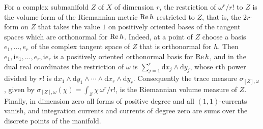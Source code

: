 For a complex submanifold $Z$ of $X$ of dimension $r$, the restriction of $\omega^r/r!$ to $Z$ is the volume form of the Riemannian metric $\operatorname{Re} h$ restricted to $Z$, that is, the $2r$-form on $Z$ that takes the value $1$ on positively oriented bases of the tangent spaces which are orthonormal for $\operatorname{Re} h$. Indeed, at a point of $Z$ choose a basis $e_1,\ldots,e_r$ of the complex tangent space of $Z$ that is orthonormal for $h$. Then $e_1,\mathrm ie_1,\ldots,e_r,\mathrm ie_r$ is a positively oriented orthonormal basis for $\operatorname{Re} h$, and in the dual real coordinates the restriction of $\omega$ is $\sum_{j=1}^r\mathrm{d}x_j\wedge\mathrm{d}y_j$, whose $r$th power divided by $r!$ is $\mathrm dx_1\wedge\mathrm dy_1\wedge\cdots\wedge\mathrm dx_r\wedge\mathrm dy_r$. Consequently the trace measure $\sigma_{[Z],\omega}$, given by $\sigma_{[Z],\omega}(\chi)=\int_Z\chi\,\omega^r/r!$, is the Riemannian volume measure of $Z$. Finally, in dimension zero all forms of positive degree and all $(1,1)$-currents vanish, and integration currents and currents of degree zero are sums over the discrete points of the manifold.
